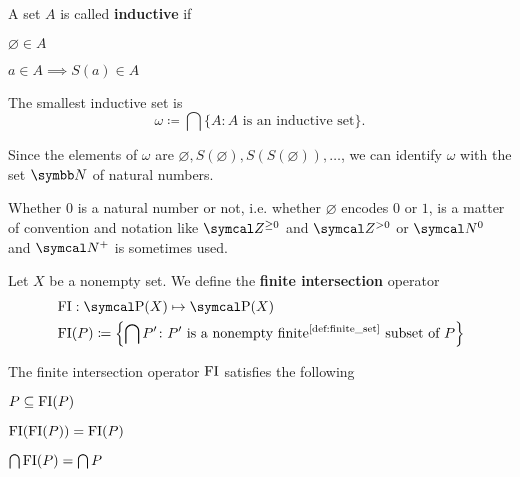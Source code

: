 \begin{definition}\label{def:inductive_set}\cite[68]{Enderton1977}
  A set \( A \) is called \textbf{inductive} if
  \begin{defenum}
    \item \( \varnothing \in A \)
    \item \( a \in A \implies S(a) \in A \)
  \end{defenum}
\end{definition}

\begin{definition}\label{def:natural_numbers_zfc}
  The smallest inductive set is
  \begin{equation*}
    \omega \coloneqq \bigcap \{ A \colon A \text{ is an inductive set} \}.
  \end{equation*}

  Since the elements of \( \omega \) are \( \varnothing, S(\varnothing), S(S(\varnothing)), \ldots \), we can identify \( \omega \) with the set \( \BB{N} \) of natural numbers.

  Whether \( 0 \) is a natural number or not, i.e. whether \( \varnothing \) encodes \( 0 \) or \( 1 \), is a matter of convention and notation like \( \Cal{Z}^{\geq 0} \) and \( \Cal{Z}^{>0} \) or \( \Cal{N}^0 \) and \( \Cal{N}^+ \) is sometimes used.
\end{definition}

\begin{definition}\label{def:finite_intersection_operator}
  Let \( X \) be a nonempty set. We define the \textbf{finite intersection} operator
  \begin{align*}
    &\FI: \Power(X) \mapsto \Power(X) \\
    &\FI(P) \coloneqq \left\{ \bigcap P' \colon P' \text{ is a nonempty finite\Tinyref{def:finite_set} subset of } P \right\}
  \end{align*}
\end{definition}

\begin{proposition}\label{thm:finite_intersection_properties}
  The finite intersection operator \( \operatorname{FI} \) satisfies the following
  \begin{defenum}
    \item \( P \subseteq \operatorname{FI}(P) \)
    \item \( \operatorname{FI}(\operatorname{FI}(P)) = \operatorname{FI}(P) \)
    \item \( \bigcap \operatorname{FI}(P) = \bigcap P \)
  \end{defenum}
\end{proposition}

